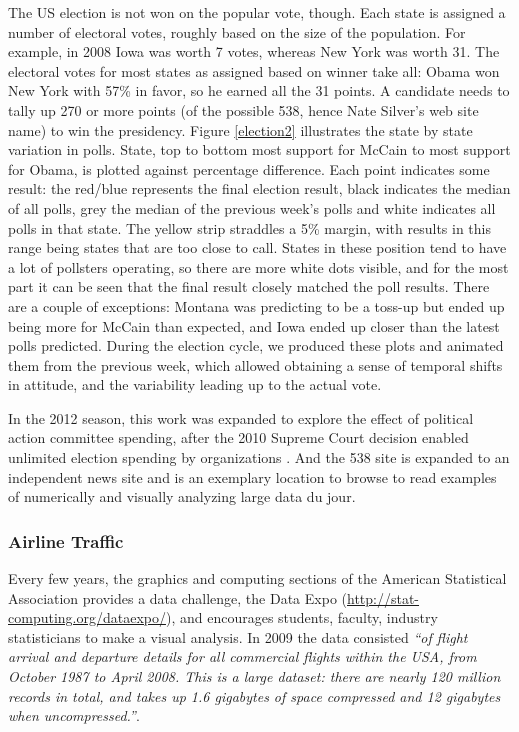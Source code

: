 \documentclass[11pt]{article}
\begin{document}
The US election is not won on the popular vote, though. Each state is assigned a number of electoral votes, roughly based on the size of the population. For example, in 2008 Iowa was worth 7 votes, whereas New York was worth 31. The electoral votes for most states as assigned based on winner take all: Obama won New York with 57\% in favor, so he earned all the 31 points. A candidate needs to tally up 270 or more points (of the possible 538, hence Nate Silver's web site name) to win the presidency. Figure \ref{election2} illustrates the state by state variation in polls. State, top to bottom most support for McCain to most support for Obama, is plotted against percentage difference. Each point indicates some result: the red/blue represents the final election result, black indicates the median of all polls, grey the median of the previous week's polls and white indicates all polls in that state. The yellow strip straddles a 5\% margin, with results in this range being states that are too close to call. States in these position tend to have a lot of pollsters operating, so there are more white dots visible, and for the most part it can be seen that the final result closely matched the poll results. There are a couple of exceptions: Montana was predicting to be a toss-up but ended up being more for McCain than expected, and Iowa ended up closer than the latest polls predicted. During the election cycle, we produced these plots and animated them from the previous week, which allowed obtaining a sense of temporal shifts in attitude, and the variability leading up to the actual vote.

In the 2012 season, this work was expanded to explore the effect of political action committee spending, after the 2010 Supreme Court decision enabled unlimited election spending by organizations \citep{kaplan2012}. And the 538 site is expanded to an independent news site and is an exemplary location to browse to read examples of numerically and visually analyzing large data du jour.

\subsubsection{Airline Traffic}

Every few years, the graphics and computing sections of the American Statistical Association provides a data challenge, the Data Expo (\url{http://stat-computing.org/dataexpo/}), and encourages students, faculty, industry statisticians to make a visual analysis. In 2009 the data consisted {\em ``of flight arrival and departure details for all commercial flights within the USA, from October 1987 to April 2008. This is a large dataset: there are nearly 120 million records in total, and takes up 1.6 gigabytes of space compressed and 12 gigabytes when uncompressed.''}.
\end{document}
